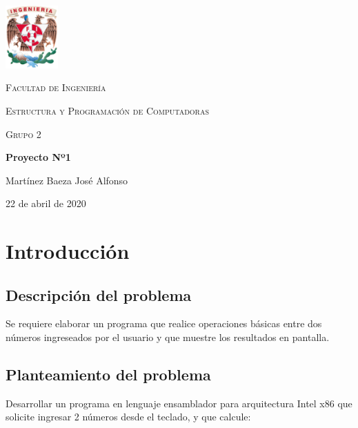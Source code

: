 \documentclass[letter,12 pt,titlepage]{article}
\begin{document}
    \begin{titlepage}
        \centering
        \includegraphics[width=0.15\textwidth]{img/escudo_fi_color.png}\par\vspace{1cm}
        {\scshape\LARGE Facultad de Ingeniería \par}
        \vspace{1cm}
        {\scshape\Large Estructura y Programación de Computadoras
        \par}
        \vspace{1cm}
        {\scshape\Large Grupo 2
        \par}
        \vspace{1.5cm}
        {\huge\bfseries Proyecto Nº1\par}
        \vspace{2cm}
        {\Large 
            Martínez Baeza José Alfonso
        \par}
        \vfill
        {\large 22 de abril de 2020\par}
    \end{titlepage}
    \newpage
    \tableofcontents
    \newpage

    \section{Introducción}

    \subsection{Descripción del problema}

        Se requiere elaborar un programa que realice operaciones básicas entre dos números ingreseados por el usuario y que muestre los resultados en pantalla.

    \subsection{Planteamiento del problema}

        Desarrollar un programa en lenguaje ensamblador para arquitectura Intel x86 que solicite ingresar 2 números desde el teclado, y que calcule:
        
\end{document}
